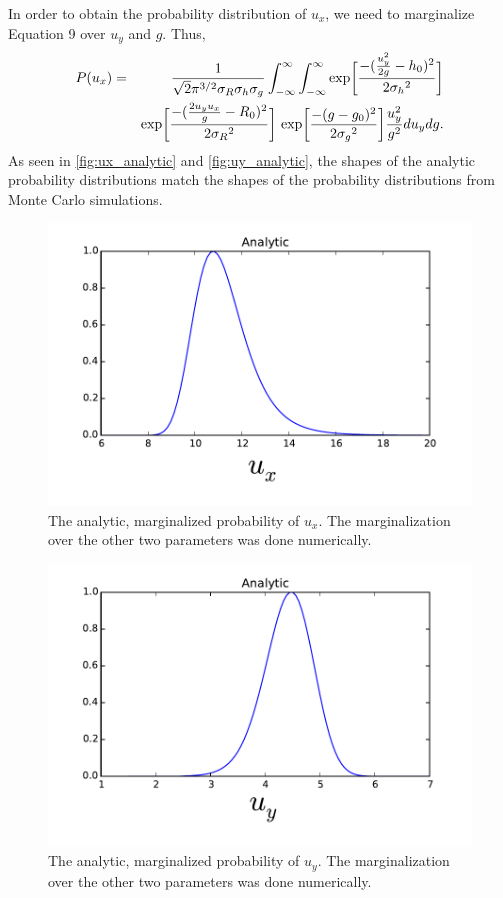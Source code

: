 \documentclass[12pt,a4paper]{article}
\begin{document}
In order to obtain the probability distribution of $u_x$, we need to marginalize Equation 9 over $u_y$ and $g$. Thus, 
\begin{eqnarray}\nonumber
P(u_x)&=& \frac{1}{\sqrt{2}\pi^{3/2}\sigma_R \sigma_h \sigma_g} \int_{-\infty}^{\infty}\int_{-\infty}^{\infty} \textnormal{exp}\bigg[{\frac {-(\frac{u_y^2}{2g}-h_0)^2}{2 {\sigma_h} ^2}}\bigg]\\
&& \textnormal{exp}\bigg[{\frac {-(\frac{2u_yu_x}{g}-R_0)^2}{2 {\sigma_R} ^2}}\bigg]\ \textnormal{exp}\bigg[{\frac {-(g-g_0)^2}{2 {\sigma_g} ^2}}\bigg]\frac{u_y^2}{g^2}du_ydg. 
\end{eqnarray}
As seen in \autoref{fig:ux_analytic} and \autoref{fig:uy_analytic}, the shapes of the analytic probability distributions match the shapes of the probability distributions from Monte Carlo simulations. 

\begin{figure}[ht]
  \centering
  \includegraphics[keepaspectratio]{ux_analytic.pdf}
  \caption{The analytic, marginalized probability of $u_x$. The marginalization
    over the other two parameters was done numerically.}
  \label{fig:ux_analytic}
\end{figure}

\begin{figure}[ht]
  \centering
  \includegraphics[keepaspectratio]{uy_analytic.pdf}
  \caption{The analytic, marginalized probability of $u_y$. The marginalization
    over the other two parameters was done numerically.}
  \label{fig:uy_analytic}
\end{figure}
\end{document}

